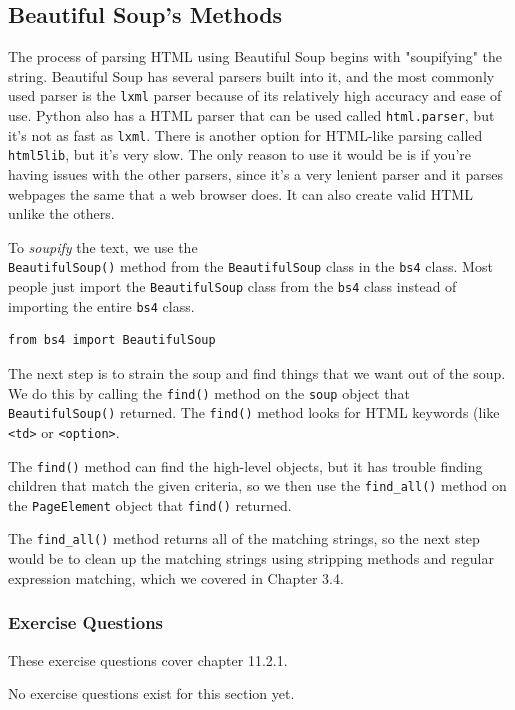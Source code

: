 \subsection{Beautiful Soup's Methods}
The process of parsing HTML using Beautiful Soup begins with "soupifying" the string. Beautiful Soup has several parsers built into it, and the most commonly used parser is the \verb|lxml| parser because of its relatively high accuracy and ease of use. Python also has a HTML parser that can be used called \verb|html.parser|, but it's not as fast as \verb|lxml|. There is another option for HTML-like parsing called \verb|html5lib|, but it's very slow. The only reason to use it would be is if you're having issues with the other parsers, since it's a very lenient parser and it parses webpages the same that a web browser does. It can also create valid HTML unlike the others.\par
To \textit{soupify} the text, we use the \\\verb|BeautifulSoup()| method from the \verb|BeautifulSoup| class in the \verb|bs4| class. Most people just import the \verb|BeautifulSoup| class from the \verb|bs4| class instead of importing the entire \verb|bs4| class.\par
\begin{lstlisting}[style=pippython]
from bs4 import BeautifulSoup
\end{lstlisting}
The next step is to strain the soup and find things that we want out of the soup. We do this by calling the \verb|find()| method on the \verb|soup| object that \verb|BeautifulSoup()| returned. The \verb|find()| method looks for HTML keywords (like \verb|<td>| or \verb|<option>|.\par
The \verb|find()| method can find the high-level objects, but it has trouble finding children that match the given criteria, so we then use the \verb|find_all()| method on the \verb|PageElement| object that \verb|find()| returned.\par
The \verb|find_all()| method returns all of the matching strings, so the next step would be to clean up the matching strings using stripping methods and regular expression matching, which we covered in Chapter 3.4.

\subsubsection*{Exercise Questions}
These exercise questions cover chapter 11.2.1.

No exercise questions exist for this section yet.

